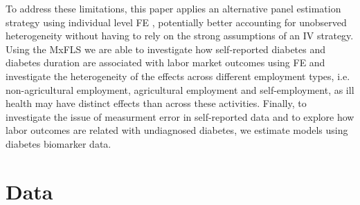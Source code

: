 \documentclass[12pt,english,british]{article}
\begin{document}
To address these limitations, this paper applies an alternative panel estimation strategy using individual level \ac{FE} , potentially better accounting for unobserved heterogeneity without having to rely on the strong assumptions of an \ac{IV} strategy. Using the \ac{MxFLS} we are able to investigate
how self-reported diabetes and diabetes duration are associated with
labor market outcomes using \ac{FE} and investigate the heterogeneity
of the effects across different employment types, i.e.
non-agricultural employment, agricultural employment and self-employment, as ill health may have distinct effects than across these activities. Finally, to investigate the issue of measurment error in self-reported data and to explore how labor outcomes are related with undiagnosed diabetes, we estimate models using diabetes biomarker data. 



\section{\label{sec:Data}Data}
\end{document}

